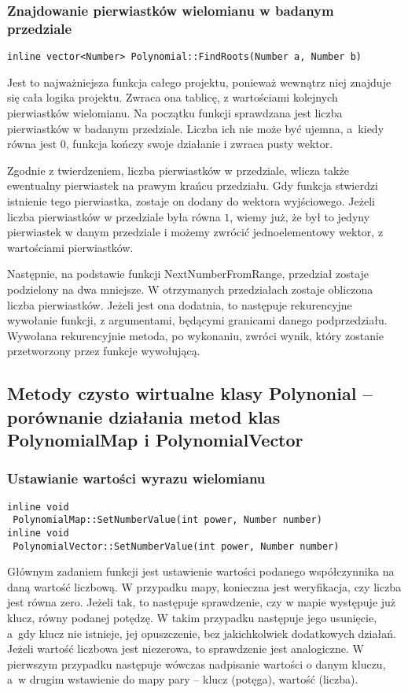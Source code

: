 \subsubsection{Znajdowanie pierwiastków wielomianu w badanym przedziale}
\begin{lstlisting}
inline vector<Number> Polynomial::FindRoots(Number a, Number b)
\end{lstlisting}

Jest to najważniejsza funkcja całego projektu, ponieważ wewnątrz niej znajduje się cała logika projektu. Zwraca ona tablicę, z wartościami kolejnych pierwiastków wielomianu. Na początku funkcji sprawdzana jest liczba pierwiastków w badanym przedziale. Liczba ich nie może być ujemna, a~kiedy równa jest $0$, funkcja kończy swoje działanie i zwraca pusty wektor.

Zgodnie z twierdzeniem, liczba pierwiastków w przedziale, wlicza także ewentualny pierwiastek na prawym krańcu przedziału. Gdy funkcja stwierdzi istnienie tego pierwiastka, zostaje on dodany do wektora wyjściowego. Jeżeli liczba pierwiastków w przedziale była równa $1$, wiemy już, że był to jedyny pierwiastek w danym przedziale i możemy zwrócić jednoelementowy wektor, z wartościami pierwiastków.

Następnie, na podstawie funkcji NextNumberFromRange, przedział zostaje podzielony na dwa mniejsze. W otrzymanych przedziałach zostaje obliczona liczba pierwiastków. Jeżeli jest ona dodatnia, to następuje rekurencyjne wywołanie funkcji, z argumentami, będącymi granicami danego podprzedziału. Wywołana rekurencyjnie metoda, po wykonaniu, zwróci wynik, który zostanie przetworzony przez funkcje wywołującą. 

\subsection{Metody czysto wirtualne klasy Polynonial – porównanie działania metod klas PolynomialMap i PolynomialVector}

\subsubsection{Ustawianie wartości wyrazu wielomianu}
\begin{lstlisting}
inline void
 PolynomialMap::SetNumberValue(int power, Number number)
inline void
 PolynomialVector::SetNumberValue(int power, Number number)
\end{lstlisting}

Głównym zadaniem funkcji jest ustawienie wartości podanego współczynnika na daną wartość liczbową. W przypadku mapy, konieczna jest weryfikacja, czy liczba jest równa zero. Jeżeli tak, to następuje sprawdzenie, czy w mapie występuje już klucz, równy podanej potędzę. W takim przypadku następuje jego usunięcie, a~gdy klucz nie istnieje, jej opuszczenie, bez jakichkolwiek dodatkowych działań. Jeżeli wartość liczbowa jest niezerowa, to sprawdzenie jest analogiczne. W pierwszym przypadku następuje wówczas nadpisanie wartości o danym kluczu, a~w drugim wstawienie do mapy pary – klucz (potęga), wartość (liczba).

